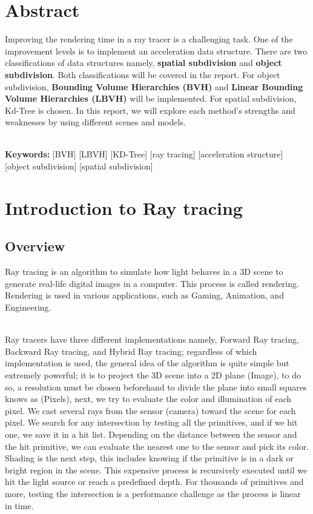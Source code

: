 \documentclass[11pt,a4paper]{article}
\begin{document}
\section*{Abstract}
Improving the rendering time in a ray tracer is a challenging task. One of the improvement levels is to implement an acceleration data structure. There are two classifications of data structures namely, \textbf{spatial subdivision} and \textbf{object subdivision}. Both classifications will be covered in the report. For object subdivision, \textbf{Bounding Volume Hierarchies (BVH)} and \textbf{Linear Bounding Volume Hierarchies (LBVH)} will be implemented. For spatial subdivision, Kd-Tree is chosen. In this report, we will explore each method's strengths and weaknesses by using different scenes and models.
  
\noindent
\\
\textbf{Keywords:} [BVH] [LBVH] [KD-Tree] [ray tracing] [acceleration structure]  [object subdivision] [spatial
subdivision] 
\clearpage
\tableofcontents
\clearpage



\section{Introduction to Ray tracing}
\subsection{Overview}
Ray tracing is an algorithm to simulate how light behaves in a 3D scene to generate real-life digital images in a computer. This process is called rendering. Rendering is used in various applications, such as Gaming, Animation, and Engineering.

\noindent
\\
Ray tracers have three different implementations namely, Forward Ray tracing, Backward Ray tracing, and Hybrid Ray tracing; regardless of which implementation is used, the general idea of the algorithm is quite simple but extremely powerful; it is to project the 3D scene into a 2D plane (Image), to do so, a resolution must be chosen beforehand to divide the plane into small squares knows as (Pixels), next, we try to evaluate the color and illumination of each pixel. We cast several rays from the sensor (camera) toward the scene for each pixel. We search for any intersection by testing all the primitives, and if we hit one, we save it in a hit list. Depending on the distance between the sensor and the hit primitive, we can evaluate the nearest one to the sensor and pick its color. Shading is the next step, this includes knowing if the primitive is in a dark or bright region in the scene. This expensive process is recursively executed until we hit the light source or reach a predefined depth. For thousands of primitives and more, testing the intersection is a performance challenge as the process is linear in time.
\end{document}
